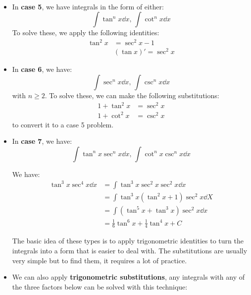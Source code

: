 \begin{itemize}
\begin{example}
\begin{align}
        \end{align}
    \end{example}
    \item In \textbf{case 5}, we have integrals in the form of either:
    \begin{equation}
        \int \tan^n x \dd{x},\, \int \cot^n x \dd{x}
    \end{equation}
    To solve these, we apply the following identities:
    \begin{align}
        \tan^2 x &= \sec^2 x - 1 \\ 
        & (\tan x)' = \sec^2 x 
    \end{align}
    \item In \textbf{case 6}, we have:
    \begin{equation}
        \int \sec^n x \dd{x},\, \int \csc^n x \dd{x}
    \end{equation}
    with $n \ge 2$. To solve these, we can make the following substitutions:
    \begin{align}
        1 + \tan^2 x &= \sec^2 x \\ 
        1 + \cot^2 x &= \csc^2 x
    \end{align}
    to convert it to a case 5 problem.
    \item In \textbf{case 7}, we have:
    \begin{equation}
        \int \tan^n x \sec^n x\dd{x},\, \int \cot^n x\csc^n x \dd{x}
    \end{equation}
    \begin{example}
        We have:
        \begin{align}
            \tan^3 x \sec^4 x \dd{x} &= \int \tan^3 x \sec^2 x \sec^2 x \dd{x} \\ 
            &= \int \tan^3 x\left(\tan^2 x + 1\right)\sec^2 x \dd{X} \\ 
            &= \int (\tan^5 x + \tan^3 x)\sec^2 x \dd{x} \\ 
            &= \frac{1}{6}\tan^6 x + \frac{1}{4}\tan^4 x + C
        \end{align}
    \end{example}
    \begin{idea}
        The basic idea of these types is to apply trigonometric identities to turn the integrals into a form that is easier to deal with. The substitutions are usually very simple but to find them, it requires a lot of practice.
    \end{idea}
    \item We can also apply \textbf{trigonometric substitutions}, any integrals with any of the three factors below can be solved with this technique:

\end{itemize}
